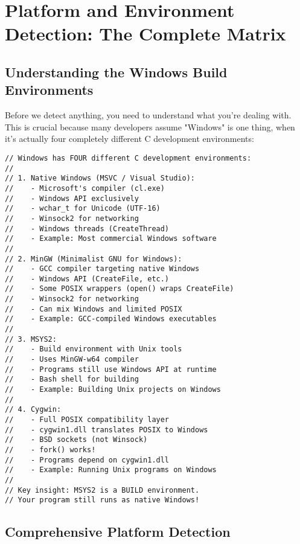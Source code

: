 \section{Platform and Environment Detection: The Complete Matrix}

\subsection{Understanding the Windows Build Environments}

Before we detect anything, you need to understand what you're dealing with. This is crucial because many developers assume "Windows" is one thing, when it's actually four completely different C development environments:

\begin{lstlisting}
// Windows has FOUR different C development environments:
//
// 1. Native Windows (MSVC / Visual Studio):
//    - Microsoft's compiler (cl.exe)
//    - Windows API exclusively
//    - wchar_t for Unicode (UTF-16)
//    - Winsock2 for networking
//    - Windows threads (CreateThread)
//    - Example: Most commercial Windows software
//
// 2. MinGW (Minimalist GNU for Windows):
//    - GCC compiler targeting native Windows
//    - Windows API (CreateFile, etc.)
//    - Some POSIX wrappers (open() wraps CreateFile)
//    - Winsock2 for networking
//    - Can mix Windows and limited POSIX
//    - Example: GCC-compiled Windows executables
//
// 3. MSYS2:
//    - Build environment with Unix tools
//    - Uses MinGW-w64 compiler
//    - Programs still use Windows API at runtime
//    - Bash shell for building
//    - Example: Building Unix projects on Windows
//
// 4. Cygwin:
//    - Full POSIX compatibility layer
//    - cygwin1.dll translates POSIX to Windows
//    - BSD sockets (not Winsock)
//    - fork() works!
//    - Programs depend on cygwin1.dll
//    - Example: Running Unix programs on Windows
//
// Key insight: MSYS2 is a BUILD environment.
// Your program still runs as native Windows!
\end{lstlisting}

\subsection{Comprehensive Platform Detection}

